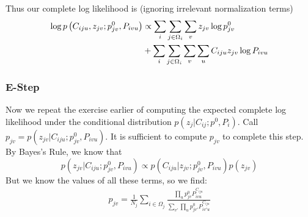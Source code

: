\documentclass[useAMS,usenatbib,a4paper]{mn2e}
\def\indic#1{\mathbb{I}\left({#1}\right)}
\begin{document}
Thus our complete log likelihood is (ignoring irrelevant normalization terms)
\begin{align}
  \log p \left( C_{iju}, z_{jv}; p_{jv}^0, P_{ivu} \right) &\propto \sum_{i} \sum_{j \in
\Omega_i} \sum_{v} z_{jv} \log p_{jv}^0
  \notag\\
  &+ \sum_{i} \sum_{j \in \Omega_i} \sum_{v} \sum_{u} C_{iju} z_{jv} \log P_{ivu}
\end{align}

\subsubsection{E-Step}

Now we repeat the exercise earlier of computing the expected complete log
likelihood under the conditional distribution $p(z_{j} | C_{ij}; p^0,
P_{i})$. Call $p_{jv} = p(z_{jv} | C_{iju}; p^0_{jv}, P_{ivu})$. It is
sufficient to compute $p_{jv}$ to complete this step. By Bayes's Rule, we
know that
$$
p(z_{jv} | C_{iju}; p^0_{jv}, P_{ivu}) \propto p(C_{iju} | z_{jv}; p^0_{jv},
P_{ivu}) p(z_{jv})
$$
But we know the values of all these terms, so we find:
\begin{align}
  p_{jv} = \frac{1}{N_j} \sum_{i \in \Omega_j} \frac{\prod_u p^0_{jv}
  P_{ivu}^{C_{iju}}}{\sum_{v'} \prod_u p^0_{jv'} P_{iv'u}^{C_{iju}}}
\end{align}
\end{document}
